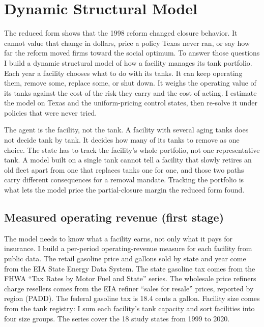 \documentclass[
  12pt,
]{article}
\begin{document}
\section{Dynamic Structural Model}\label{dynamic-structural-model}

The reduced form shows that the 1998 reform changed closure behavior. It
cannot value that change in dollars, price a policy Texas never ran, or
say how far the reform moved firms toward the social optimum. To answer
those questions I build a dynamic structural model of how a facility
manages its tank portfolio. Each year a facility chooses what to do with
its tanks. It can keep operating them, remove some, replace some, or
shut down. It weighs the operating value of its tanks against the cost
of the risk they carry and the cost of acting. I estimate the model on
Texas and the uniform-pricing control states, then re-solve it under
policies that were never tried.

The agent is the facility, not the tank. A facility with several aging
tanks does not decide tank by tank. It decides how many of its tanks to
remove as one choice. The state has to track the facility's whole
portfolio, not one representative tank. A model built on a single tank
cannot tell a facility that slowly retires an old fleet apart from one
that replaces tanks one for one, and those two paths carry different
consequences for a removal mandate. Tracking the portfolio is what lets
the model price the partial-closure margin the reduced form found.

\subsection{Measured operating revenue (first
stage)}\label{measured-operating-revenue-first-stage}

The model needs to know what a facility earns, not only what it pays for
insurance. I build a per-period operating-revenue measure for each
facility from public data. The retail gasoline price and gallons sold by
state and year come from the EIA State Energy Data System. The state
gasoline tax comes from the FHWA ``Tax Rates by Motor Fuel and State''
series. The wholesale price refiners charge resellers comes from the EIA
refiner ``sales for resale'' prices, reported by region (PADD). The
federal gasoline tax is 18.4 cents a gallon. Facility size comes from
the tank registry: I sum each facility's tank capacity and sort
facilities into four size groups. The series cover the 18 study states
from 1999 to 2020.
\end{document}
